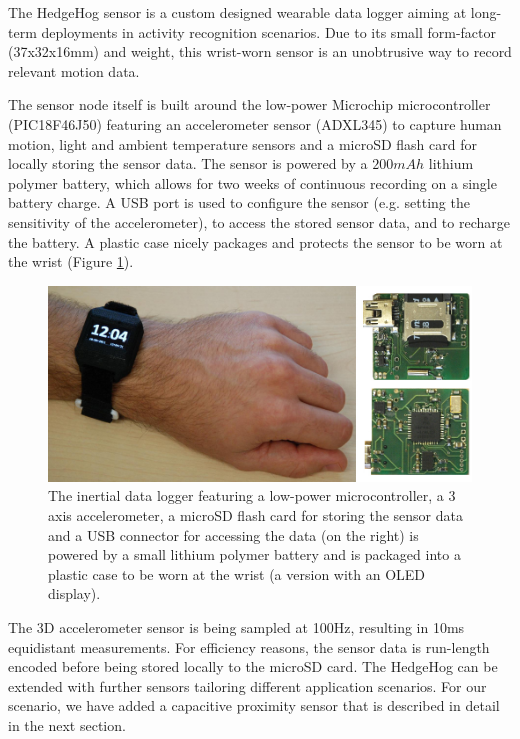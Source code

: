 \documentclass[runningheads,a4paper]{llncs}
\begin{document}
The HedgeHog sensor \cite{hedgehog} is a custom designed wearable data logger aiming at long-term deployments in activity recognition scenarios. Due to its small form-factor (37x32x16mm) and weight, this wrist-worn sensor is an unobtrusive way to record relevant motion data.


The sensor node itself is built around the low-power Microchip microcontroller (PIC18F46J50) featuring an accelerometer sensor (ADXL345) to capture human motion, light and ambient temperature sensors and a microSD flash card for locally storing the sensor data. The sensor is powered by a $200mAh$ lithium polymer battery, which allows for two weeks of continuous recording on a single battery charge. A USB port is used to configure the sensor (e.g. setting the sensitivity of the accelerometer), to access the stored sensor data, and to recharge the battery. A plastic case nicely packages and protects the sensor to be worn at the wrist (Figure \ref{fig:sensornode}).

\begin{figure}
	\centering
	\includegraphics[width=\textwidth]{Images/hardware_sensor_2.jpg}
	\caption{The inertial data logger featuring a low-power microcontroller, a 3 axis accelerometer, a microSD flash card for storing the sensor data and a USB connector for accessing the data (on the right) is powered by a small lithium polymer battery and is packaged into a plastic case to be worn at the wrist (a version with an OLED display).}
	\label{fig:sensornode}
\end{figure}

The 3D accelerometer sensor is being sampled at 100Hz, resulting in 10ms equidistant measurements. For efficiency reasons, the sensor data is run-length encoded before being stored locally to the microSD card. 
The HedgeHog can be extended with further sensors tailoring different application scenarios. For our scenario, we have added a capacitive proximity sensor that is described in detail in the next section.
\end{document}
